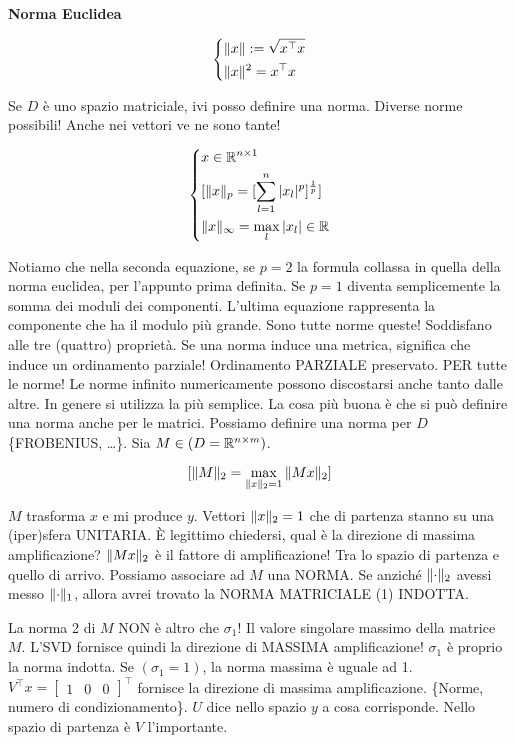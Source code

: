 \begin{defn}{\textbf{Norma Euclidea}}

\[
	\left\{
	\begin{aligned}
	&\lVert x\rVert:=\sqrt{x^\top x}\\
	&\lVert x\rVert^2 = x^\top x
	\end{aligned}
	\right.
\]

\end{defn}

Se $D$ è uno spazio matriciale, ivi posso definire una norma. Diverse norme possibili! Anche nei vettori ve ne sono tante!

\[	
	\left\{
	\begin{aligned}
	&x\in\mathbb{R}^{n\times 1}\\
	&[\lVert x\rVert_p = [\sum_{l=1}^n{\lvert x_l\rvert^p}]^\frac{1}{p}]\\
	&\lVert x\rVert_\infty = \max_l{\lvert x_l\rvert}\in\mathbb{R}
	\end{aligned}
	\right.
\]

Notiamo che nella seconda equazione, se $p=2$ la formula collassa in quella della norma euclidea, per l'appunto prima definita. Se $p=1$ diventa semplicemente la somma dei moduli dei componenti. L'ultima equazione rappresenta la componente che ha il modulo più grande. Sono tutte norme queste! Soddisfano alle tre (quattro) proprietà. Se una norma induce una metrica, significa che induce un ordinamento parziale! Ordinamento PARZIALE preservato. PER tutte le norme! Le norme infinito numericamente possono discostarsi anche tanto dalle altre. In genere si utilizza la più semplice. La cosa più buona è che si può definire una norma anche per le matrici. Possiamo definire una norma per $D$ \{FROBENIUS, \dots\}. Sia $M\in(D=\mathbb{R}^{n\times m})$.

\[
	[\lVert M\rVert_2 = \max_{\lVert x\rVert_2=1}{\lVert Mx\rVert_2}]
\]

$M$ trasforma $x$ e mi produce $y$. Vettori $\lVert x\rVert_2=1$ che di partenza stanno su una (iper)sfera UNITARIA. \`E legittimo chiedersi, qual è la direzione di massima amplificazione? $\lVert Mx\rVert_2$ è il fattore di amplificazione! Tra lo spazio di partenza e quello di arrivo. Possiamo associare ad $M$ una NORMA. Se anziché $\lVert\mathord{\cdot}\rVert_2$ avessi messo $\lVert\mathord{\cdot}\rVert_1$, allora avrei trovato la NORMA MATRICIALE (1) INDOTTA.

La norma 2 di $M$ NON è altro che $\sigma_1$! Il valore singolare massimo della matrice $M$. L'SVD fornisce quindi la direzione di MASSIMA amplificazione! $\sigma_1$ è proprio la norma indotta. Se $(\sigma_1=1)$, la norma massima è uguale ad 1. $V^\top x=\begin{bmatrix}1&0&0\end{bmatrix}^\top$ fornisce la direzione di massima amplificazione. \{Norme, numero di condizionamento\}. $U$ dice nello spazio $y$ a cosa corrisponde. Nello spazio di partenza è $V$ l'importante.

